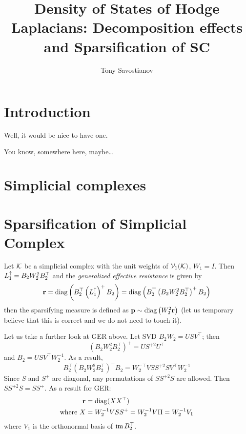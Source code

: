 \documentclass{mynotes}
\title{Density of States of Hodge Laplacians: Decomposition effects and Sparsification of SC}
\author[1]{ Tony Savostianov }
\affil[1]{ RWTH, Aachen   \\ email: \email{a.s.savostyanov@gmail.com} }
\begin{document}
\maketitle


\chapter{Introduction}

Well, it would be nice to have one. 

You know, somewhere here, maybe\dots


\chapter{ Simplicial complexes }




\chapter{Sparsification of Simplicial Complex}

Let \( \mathcal{K} \) be a simplicial complex with the unit weights of \( \mathcal{V}_{1}(\mathcal{K}) \), \( W_1 = I \). Then \( L_{1}^{\uparrow} = B_2 W_2^2 B_2^\top \) and the \emph{generalized effective resistance} is given by 
\begin{equation}
      \mathbf{r} = \operatorname{diag} \left( B_2^\top \left( L_{1}^{\uparrow} \right)^+ B_2 \right) = \operatorname{diag} \left( B_2^\top \left( B_2 W_2^2 B_2^\top \right)^+ B_2 \right)
\end{equation}
then the sparsifying measure is defined as \( \mathbf{p} \sim \operatorname{diag} \left( W_2^2 \mathbf{r}  \right)\) (let us temporary believe that this is correct and we do not need to touch it).

\begin{remark}
      Let us take a further look at GER above. Let SVD 
      \( B_2 W_2 = U S V^\top\); then 
      \begin{equation}
            \left( B_2 W_2^2 B_2^\top \right)^+ = U S^{+2} U^\top 
      \end{equation}
      and \( B_2 = U S V^\top W_2^{-1} \). As a result, 
      \begin{equation}
            B_2^\top \left( B_2 W_2^2 B_2^\top \right)^+ B_2 = W_2^{-\top} V S S^{+2} S V^\top W_2^{-1} 
      \end{equation}
      Since \( S \) and \( S^+ \) are diagonal, any permutations of \( S S^{+2} S \) are allowed. Then \( S S^{+2} S = S S^+ \). As a result for GER:  
      \begin{equation}
            \begin{aligned}
                  \mathbf{r} & = \operatorname{diag}( X X^\top ) \\
                  \text{where } X & = W_2^{-1} V S S^+ = W_2^{-1} V \Pi = W_2^{-1} V_1 
            \end{aligned}
      \end{equation}
      where \( V_1 \) is the orthonormal basis of \( \operatorname{im} B_2^\top \).
\end{remark}





\clearpage
\nocite{*}


\end{document}
